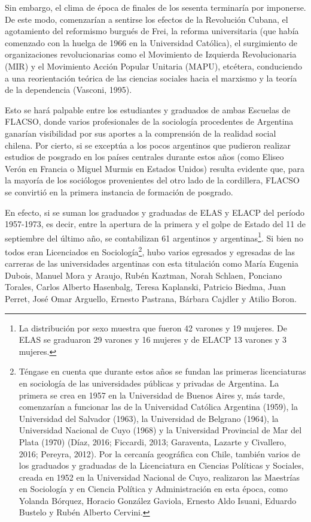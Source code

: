 Sin embargo, el clima de época de finales de los sesenta terminaría por imponerse. De este modo, comenzarían a sentirse los efectos de la Revolución Cubana, el agotamiento del reformismo burgués de Frei, la reforma universitaria (que había comenzado con la huelga de 1966 en la Universidad Católica), el surgimiento de organizaciones revolucionarias como el Movimiento de Izquierda Revolucionaria (MIR) y el Movimiento Acción Popular Unitaria (MAPU), etcétera, conduciendo a una reorientación teórica de las ciencias sociales hacia el marxismo y la teoría de la dependencia (Vasconi, 1995).

Esto se hará palpable entre los estudiantes y graduados de ambas Escuelas de FLACSO, donde varios profesionales de la sociología procedentes de Argentina ganarían visibilidad por sus aportes a la comprensión de la realidad social chilena. Por cierto, si se exceptúa a los pocos argentinos que pudieron realizar estudios de posgrado en los países centrales durante estos años (como Eliseo Verón en Francia o Miguel Murmis en Estados Unidos) resulta evidente que, para la mayoría de los sociólogos provenientes del otro lado de la cordillera, FLACSO se convirtió en la primera instancia de formación de posgrado.

En efecto, si se suman los graduados y graduadas de ELAS y ELACP del período 1957-1973, es decir, entre la apertura de la primera y el golpe de Estado del 11 de septiembre del último año, se contabilizan 61 argentinos y argentinas\footnote{La distribución por sexo muestra que fueron 42 varones y 19 mujeres. De ELAS se graduaron 29 varones y 16 mujeres y de ELACP 13 varones y 3 mujeres.}. Si bien no todos eran Licenciados en Sociología\footnote{Téngase en cuenta que durante estos años se fundan las primeras licenciaturas en sociología de las universidades públicas y privadas de Argentina. La primera se crea en 1957 en la Universidad de Buenos Aires y, más tarde, comenzarían a funcionar las de la Universidad Católica Argentina (1959), la Universidad del Salvador (1963), la Universidad de Belgrano (1964), la Universidad Nacional de Cuyo (1968) y la Universidad Provincial de Mar del Plata (1970) (Díaz, 2016; Ficcardi, 2013; Garaventa, Lazarte y Civallero, 2016; Pereyra, 2012). Por la cercanía geográfica con Chile, también varios de los graduados y graduadas de la Licenciatura en Ciencias Políticas y Sociales, creada en 1952 en la Universidad Nacional de Cuyo, realizaron las Maestrías en Sociología y en Ciencia Política y Administración en esta época, como Yolanda Bórquez, Horacio González Gaviola, Ernesto Aldo Isuani, Eduardo Bustelo y Rubén Alberto Cervini.}, hubo varios egresados y egresadas de las carreras de las universidades argentinas con esta titulación como María Eugenia Dubois, Manuel Mora y Araujo, Rubén Kaztman, Norah Schlaen, Ponciano Torales, Carlos Alberto Hasenbalg, Teresa Kaplanski, Patricio Biedma, Juan Perret, José Omar Arguello, Ernesto Pastrana, Bárbara Cajdler y Atilio Boron.

